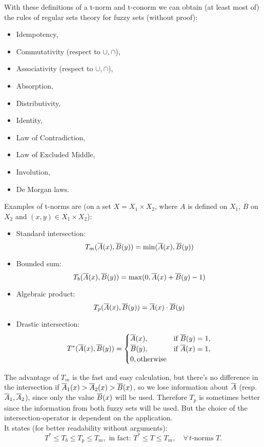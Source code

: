 \vspace*{0.75cm} \hspace*{-1.5em}
With these definitions of a t-norm and t-conorm we can obtain (at least most of) the rules of regular sets theory for fuzzy sets (without proof):
\begin{itemize}
\item Idempotency,
\item Commutativity (respect to $\cup, \cap$),
\item Associativity (respect to $\cup, \cap$),
\item Absorption,
\item Distributivity,
\item Identity,
\item Law of Contradiction,
\item Law of Excluded Middle,
\item Involution,
\item De Morgan laws.
\end{itemize}
Examples of t-norms are (on a set $X=X_1\times X_2$, where $A$ is defined on $X_1$, $B$ on $X_2$ and $(x,y)\in X_1\times X_2$):
\begin{itemize}
\item Standard intersection:
	\[ T_m(\overline{A}(x),\overline{B}(y)) = \min(\overline{A}(x),\overline{B}(y)) \]
\item Bounded sum:
	\[ T_b(\overline{A}(x),\overline{B}(y)) = \max(0, \overline{A}(x)+\overline{B}(y)-1) \]
\item Algebraic product:
	\[ T_p(\overline{A}(x),\overline{B}(y)) = \overline{A}(x)\cdot\overline{B}(y) \]
\item Drastic intersection:
	\[ T^*(\overline{A}(x),\overline{B}(y)) = \begin{cases}
	\overline{A}(x), &\text{if } \overline{B}(y)=1,\\
	\overline{B}(y), &\text{if } \overline{A}(x)=1,\\
	0, \text{otherwise}
	\end{cases} \]
\end{itemize}
The advantage of $T_m$ is the fast and easy calculation, but there's no difference in the intersection if $\overline{A}_1(x)>\overline{A}_2(x)>\overline{B}(x)$, so we lose information about $\overline{A}$ (resp. $\overline{A}_1,\overline{A}_2$), since only the value $\overline{B}(x)$ will be used. Therefore $T_p$ is sometimes better since the information from both fuzzy sets will be used. But the choice of the intersection-operator is dependent on the application.\\
It states (for better readability without arguments):
	\[ T^* \leq T_b \leq T_p \leq T_m,\text{ in fact: } T^* \leq T \leq T_m,\quad\forall\, t\text{-norms } T. \]
